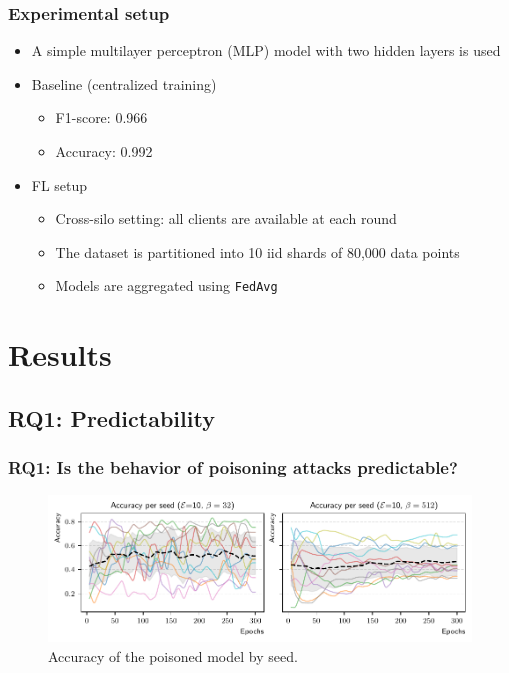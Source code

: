 \documentclass[color,t,presentation,english,aspectratio=169]{beamer}
\begin{document}
\begin{frame}
\frametitle{Experimental setup}
\begin{itemize}
    \item A simple multilayer perceptron (MLP) model with two hidden layers is used
    \item Baseline (centralized training)
    \begin{itemize}
        \item F1-score: 0.966
        \item Accuracy: 0.992
    \end{itemize}
    \item FL setup
    \begin{itemize}
        \item Cross-silo setting: all clients are available at each round
        \item The dataset is partitioned into 10 \gls{iid} shards of 80,000 data points
        \item Models are aggregated using \texttt{FedAvg}
    \end{itemize}
\end{itemize}
\end{frame}

\section{Results}

\subsection{RQ1: Predictability}

\begin{frame}
\frametitle{RQ1: Is the behavior of poisoning attacks predictable?}
\begin{figure}
	\centering
	\includegraphics[width=.8\textwidth]{figures/predictability-all.pdf}
	\caption{Accuracy of the poisoned model by seed.}
\end{figure}
\end{frame}
\end{document}
